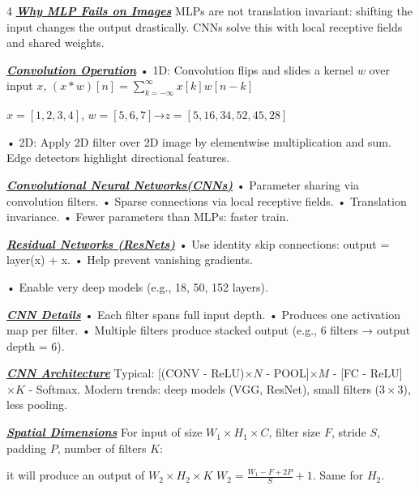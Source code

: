 \documentclass[10pt]{article}
\newcommand{\bulletPoint}[1]{\ul{\textit{\textbf{#1}}}}
\begin{document}
\begin{multicols*}{4}
\bulletPoint{Why MLP Fails on Images} \quad
MLPs are not translation invariant: shifting the input changes the output drastically. CNNs solve this with local receptive fields and shared weights.

\bulletPoint{Convolution Operation} \quad
• 1D: Convolution flips and slides a kernel $w$ over input $x$,
$(x * w)[n] = \sum_{k=-\infty}^{\infty} x[k] w[n-k]$

$x = [1, 2, 3, 4]$, $w = [5, 6, 7]$→$z = [5, 16, 34, 52, 45, 28]$

• 2D: Apply 2D filter over 2D image by elementwise multiplication and sum. Edge detectors highlight directional features.

\bulletPoint{Convolutional Neural Networks(CNNs)} \quad
• Parameter sharing via convolution filters. 
• Sparse connections via local receptive fields. 
• Translation invariance. 
• Fewer parameters than MLPs: faster train.






\bulletPoint{Residual Networks (ResNets)} \quad
• Use identity skip connections: output = layer(x) + x. \quad
• Help prevent vanishing gradients. \quad

• Enable very deep models (e.g., 18, 50, 152 layers).

\bulletPoint{CNN Details} \quad
• Each filter spans full input depth. \quad
• Produces one activation map per filter. \quad
• Multiple filters produce stacked output (e.g., 6 filters → output depth = 6). 

\bulletPoint{CNN Architecture} \quad
Typical: [(CONV - ReLU)$\times N$ - POOL]$\times M$ - [FC - ReLU]$\times K$ - Softmax. \quad
Modern trends: deep models (VGG, ResNet), small filters ($3\times3$), less pooling.


\bulletPoint{Spatial Dimensions} \quad
For input of size $W_1 \times H_1 \times C$, filter size $F$, stride $S$, padding $P$, number of filters $K$:

it will produce an output of $W_2 \times H_2 \times K$
$W_2 = \frac{W_1 - F + 2P}{S} + 1$. Same for $H_2$. 


\end{multicols*}
\end{document}
